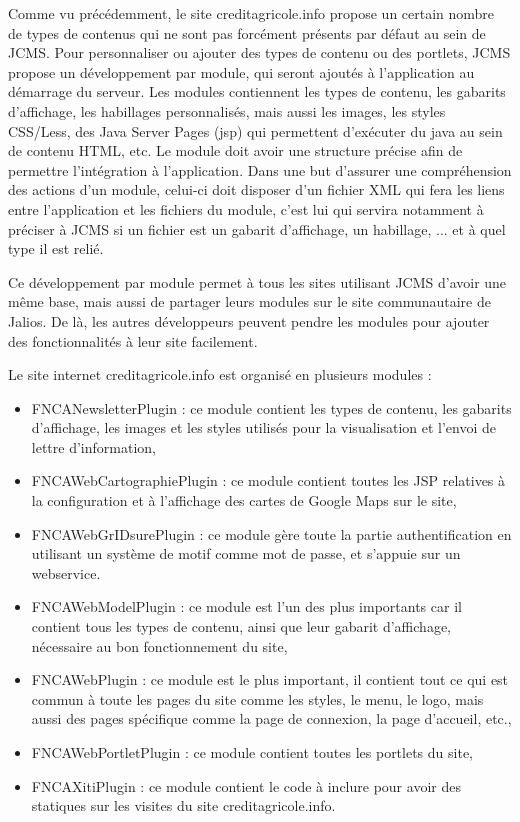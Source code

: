 \documentclass[12pt,a4paper]{article}
\begin{document}
\medskip
Comme vu précédemment, le site creditagricole.info propose un certain nombre de types de contenus qui ne sont pas forcément présents par défaut au sein de \gls{JCMS}. Pour personnaliser ou ajouter des types de contenu ou des portlets, \gls{JCMS} propose un développement par module, qui seront ajoutés à l'application au démarrage du serveur. Les modules contiennent les types de contenu, les gabarits d'affichage, les habillages personnalisés, mais aussi les images, les styles \gls{CSS}/Less, des Java Server Pages (jsp) qui permettent d'exécuter du java au sein de contenu \gls{HTML}, etc. Le module doit avoir une structure précise afin de permettre l'intégration à l'application. Dans une but d'assurer une compréhension des actions d'un module, celui-ci doit disposer d'un fichier XML qui fera les liens entre l'application et les fichiers du module, c'est lui qui servira notamment à préciser à \gls{JCMS} si un fichier est un gabarit d'affichage, un habillage, ... et à quel type il est relié.\par 
Ce développement par module permet à tous les sites utilisant \gls{JCMS} d'avoir une même base, mais aussi de partager leurs modules sur le site communautaire de Jalios. De là, les autres développeurs peuvent pendre les modules pour ajouter des fonctionnalités à leur site facilement.\par 
Le site internet creditagricole.info est organisé en plusieurs modules :
\begin{itemize}
\item FNCANewsletterPlugin : ce module contient les types de contenu, les gabarits d'affichage, les images et les styles utilisés pour la visualisation et l'envoi de lettre d'information,
\item FNCAWebCartographiePlugin : ce module contient toutes les JSP relatives à la configuration et à l'affichage des cartes de Google Maps sur le site,
\item FNCAWebGrIDsurePlugin : ce module gère toute la partie authentification en utilisant un système de motif comme mot de passe, et s'appuie sur un webservice.
\item FNCAWebModelPlugin : ce module est l'un des plus importants car il contient tous les types de contenu, ainsi que leur gabarit d'affichage, nécessaire au bon fonctionnement du site,
\item FNCAWebPlugin : ce module est le plus important, il contient tout ce qui est commun à toute les pages du site comme les styles, le menu, le logo, mais aussi des pages spécifique comme la page de connexion, la page d'accueil, etc.,
\item FNCAWebPortletPlugin : ce module contient toutes les portlets du site,
\item FNCAXitiPlugin : ce module contient le code à inclure pour avoir des statiques sur les visites du site creditagricole.info.
\end{itemize}\par
\end{document}
